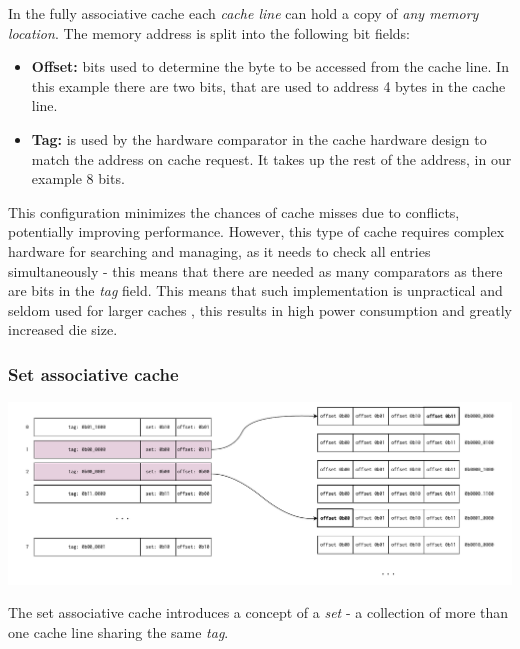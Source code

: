 \noindent In the fully associative cache each \textit{cache line} can hold a copy of \textit{any memory location}. The memory address is split into the following bit fields:

\begin{itemize}
	\item \textbf{Offset:} bits used to determine the byte to be accessed from the cache line. In this example there are two bits, that are used to address 4 bytes in the cache line.
	\item \textbf{Tag:} is used by the hardware comparator in the cache hardware design to match the address on cache request. It takes up the rest of the address, in our example 8 bits.
\end{itemize}


\noindent This configuration minimizes the chances of cache misses due to conflicts, potentially improving performance. However, this type of cache requires complex hardware for
searching and managing, as it needs to check all entries simultaneously - this means that there are needed as many comparators as there are bits in the \textit{tag} field.
This means that such implementation is unpractical and seldom used for larger caches \cite{whatevery}, this results in high power consumption and greatly increased die size.

\subsubsection{Set associative cache}
\begin{center}
	\centering
	\includegraphics[width=\textwidth]{figures/02-background/set_ass_mem.pdf}
	\label{fig:set_ass_mem}
\end{center}

\noindent The set associative cache introduces a concept of a \textit{set} - a collection of more than one cache line sharing the same \textit{tag}.

